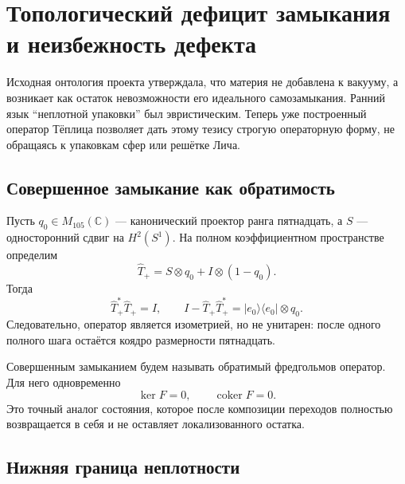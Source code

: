 \chapter{Топологический дефицит замыкания и неизбежность дефекта}

Исходная онтология проекта утверждала, что материя не добавлена к вакууму,
а возникает как остаток невозможности его идеального самозамыкания. Ранний
язык ``неплотной упаковки'' был эвристическим. Теперь уже построенный
оператор Тёплица позволяет дать этому тезису строгую операторную форму,
не обращаясь к упаковкам сфер или решётке Лича.

\section{Совершенное замыкание как обратимость}

Пусть $q_0\in M_{105}(\mathbb C)$ --- канонический проектор ранга
пятнадцать, а $S$ --- односторонний сдвиг на $H^2(S^1)$. На полном
коэффициентном пространстве определим
\begin{equation}
 \widehat T_+
 =S\otimes q_0+I\otimes(1-q_0).
 \label{eq:v5-full-coefficient-toeplitz}
\end{equation}
Тогда
\begin{equation}
 \widehat T_+^*\widehat T_+=I,
 \qquad
 I-\widehat T_+\widehat T_+^*
 =|e_0\rangle\langle e_0|\otimes q_0.
 \label{eq:v5-one-sided-closure-defect}
\end{equation}
Следовательно, оператор является изометрией, но не унитарен: после одного
полного шага остаётся коядро размерности пятнадцать.

Совершенным замыканием будем называть обратимый фредгольмов оператор. Для
него одновременно
\begin{equation}
 \ker F=0,
 \qquad
 \operatorname{coker}F=0.
\end{equation}
Это точный аналог состояния, которое после композиции переходов полностью
возвращается в себя и не оставляет локализованного остатка.

\section{Нижняя граница неплотности}

